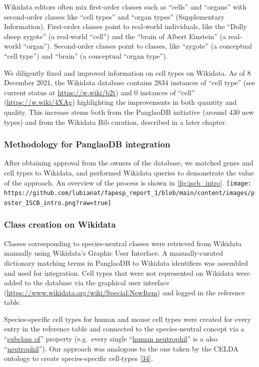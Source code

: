 Wikidata editors often mix first-order classes such as ``cells'' and ``organs'' with second-order classes like ``cell types'' and ``organ types'' (Supplementary Information). First-order classes point to real-world individuals, like the ``Dolly sheep zygote'' (a real-world ``cell'') and the ``brain of Albert Einstein'' (a real-world ``organ''). Second-order classes point to classes, like ``zygote'' (a conceptual ``cell type'') and ``brain'' (a conceptual ``organ type'').

We diligently fixed and improved information on cell types on Wikidata.
As of 8 December 2021, the Wikidata database contains 2834 instances of ``cell type'' (see current status at \url{https://w.wiki/b2t}) and 0 instances of ``cell'' (\url{https://w.wiki/4XAg}) highlighting the improvements in both quantity and quality.
This increase stems both from the PanglaoDB initiative (around 430 new types) and from the Wikidata Bib curation, described in a later chapter.

\hypertarget{methodology-for-panglaodb-integration}{%
\subsubsection{Methodology for PanglaoDB integration}\label{methodology-for-panglaodb-integration}}

After obtaining approval from the owners of the database, we matched genes and cell types to Wikidata, and performed Wikidata queries to demonstrate the value of the approach. An overview of the process is shown in \ref{fig:iscb_intro}.
\texttt{[image: https://github.com/lubianat/fapesp\_report\_1/blob/main/content/images/poster\_ISCB\_intro.png?raw=true]}

\hypertarget{class-creation-on-wikidata}{%
\subsubsection{Class creation on Wikidata}\label{class-creation-on-wikidata}}

Classes corresponding to species-neutral classes were retrieved from Wikidata manually using Wikidata's Graphic User Interface.
A manually-curated dictionary matching terms in PanglaoDB to Wikidata identifiers was assembled and used for integration.
Cell types that were not represented on Wikidata were added to the database via the graphical user interface (\url{https://www.wikidata.org/wiki/Special:NewItem}) and logged in the reference table.

Species-specific cell types for human and mouse cell types were created for every entry in the reference table and connected to the species-neutral concept via a ``\href{http://www.wikidata.org/entity/P279}{subclass of}'' property (e.g.~every single ``\href{http://www.wikidata.org/entity/Q101405102}{human neutrophil}'' is a also ``\href{http://www.wikidata.org/entity/Q188417}{neutrophil}'').
Our approach was analogous to the one taken by the CELDA ontology to create species-specific cell-types {[}\protect\hyperlink{ref-RLHsA1U8}{34}{]}.

